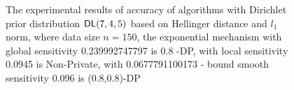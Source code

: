 \begin{figure}
\begin{center}
\centering
\caption{The experimental results of accuracy of algorithms with Dirichlet prior distribution $\mathsf{DL}(7, 4, 5)$ based on Hellinger distance and $l_1$ norm, where data size $n = 150$, the exponential mechanism with global sensitivity 0.239992747797 is 0.8 -DP, with local sensitivity 0.0945 is Non-Private, with 0.0677791100173 - bound smooth sensitivity 0.096 is (0.8,0.8)-DP}
\label{fig_dirichlet_hellinger_l1}
\end{center}
\end{figure}

\printbibliography



